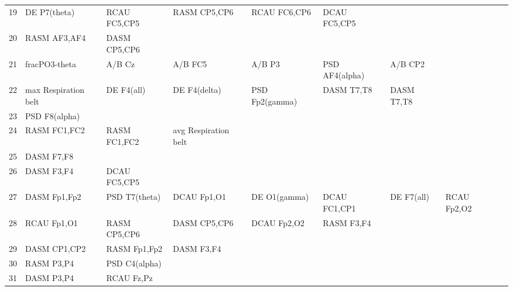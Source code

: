 \begin{landscape}
\begin{table}[]
\begin{tabular}{l|llllllll}
19                 & DE P7(theta)         & RCAU FC5,CP5            & RASM CP5,CP6         & RCAU FC6,CP6       & DCAU FC5,CP5          &                      &                 &                 \\
20                 & RASM AF3,AF4         & DASM CP5,CP6            &                      &                    &                       &                      &                 &                 \\
21                 & fracPO3-theta        & A/B Cz                  & A/B FC5              & A/B P3             & PSD AF4(alpha)        & A/B CP2              &                 &                 \\
22                 & max Respiration belt & DE F4(all)              & DE F4(delta)         & PSD Fp2(gamma)     & DASM T7,T8            & DASM T7,T8           &                 &                 \\
23                 & PSD F8(alpha)        &                         &                      &                    &                       &                      &                 &                 \\
24                 & RASM FC1,FC2         & RASM FC1,FC2            & avg Respiration belt &                    &                       &                      &                 &                 \\
25                 & DASM F7,F8           &                         &                      &                    &                       &                      &                 &                 \\
26                 & DASM F3,F4           & DCAU FC5,CP5            &                      &                    &                       &                      &                 &                 \\
27                 & DASM Fp1,Fp2         & PSD T7(theta)           & DCAU Fp1,O1          & DE O1(gamma)       & DCAU FC1,CP1          & DE F7(all)           & RCAU Fp2,O2     &                 \\
28                 & RCAU Fp1,O1          & RASM CP5,CP6            & DASM CP5,CP6         & DCAU Fp2,O2        & RASM F3,F4            &                      &                 &                 \\
29                 & DASM CP1,CP2         & RASM Fp1,Fp2            & DASM F3,F4           &                    &                       &                      &                 &                 \\
30                 & RASM P3,P4           & PSD C4(alpha)           &                      &                    &                       &                      &                 &                 \\
31                 & DASM P3,P4           & RCAU Fz,Pz              &                      &                    &                       &                      &                 &                 \\
\end{tabular}
\end{table}
\end{landscape}

